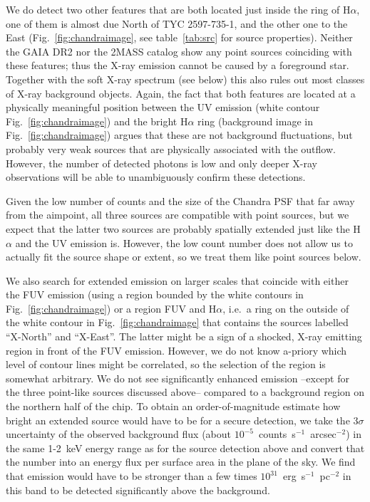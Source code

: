 \documentclass[]{aastex631}
\begin{document}
We do detect two other features that are both located just inside the ring of H$\alpha$, one of them is almost due North of TYC 2597-735-1, and the other one to the East (Fig.~\ref{fig:chandraimage}, see table~\ref{tab:src} for source properties).  Neither the GAIA DR2 \citep{2016A&A...595A...1G,2018A&A...616A...1G} nor the 2MASS \citep{2006AJ....131.1163S} catalog show any point sources coinciding with these features; thus the X-ray emission cannot be caused by a foreground star. Together with the soft X-ray spectrum (see below) this also rules out most classes of X-ray background objects. Again, the fact that both features are located at a physically meaningful position between the UV emission (white contour Fig.~\ref{fig:chandraimage}) and the bright H$\alpha$ ring (background image in Fig.~\ref{fig:chandraimage}) argues that these are not background fluctuations, but probably very weak sources that are physically associated with the outflow. However, the number of detected photons is low and only deeper X-ray observations will be able to unambiguously confirm these detections.

Given the low number of counts and the size of the Chandra PSF that far away from the aimpoint, all three sources are compatible with point sources, but we expect that the latter two sources are probably spatially extended just like the H$\alpha$ and the UV emission is. However, the low count number does not allow us to actually fit the source shape or extent, so we treat them like point sources below.

We also search for extended emission on larger scales that coincide with either the FUV emission (using a region bounded by the white contours  in Fig.~\ref{fig:chandraimage}) or a region FUV and H$\alpha$, i.e.\ a ring on the outside of the white contour in Fig.~\ref{fig:chandraimage} that contains the sources labelled ``X-North'' and ``X-East''. The latter might be a sign of a shocked, X-ray emitting region in front of the FUV emission. However, we do not know a-priory which level of contour lines might be correlated, so the selection of the region is somewhat arbitrary. We do not see significantly enhanced emission --except for the three point-like sources discussed above-- compared to a background region on the northern half of the chip. To obtain an order-of-magnitude estimate how bright an extended source would have to be for a secure detection, we take the $3\sigma$ uncertainty of the observed background flux (about $10^{-5}$~counts~s$^{-1}$~arcsec$^{-2}$) in the same 1-2~keV energy range as for the source detection above and convert that the number into an energy flux per surface area in the plane of the sky. We find that emission would have to be stronger than a few times $10^{31}$~erg~s$^{-1}$~pc$^{-2}$ in this band to be detected significantly above the background.
\end{document}

